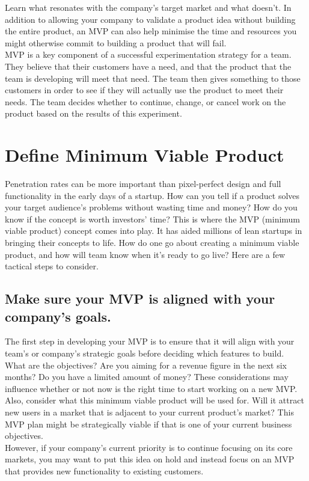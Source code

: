 \documentclass[paper=a4, fontsize=11pt]{scrartcl}
\numberwithin{equation}{section}		%
\numberwithin{figure}{section}			%
\numberwithin{table}{section}				%
\begin{document}
Learn what resonates with the company's target market and what doesn't. In addition to allowing your company to validate a product idea without building the entire product, an MVP can also help minimise the time and resources you might otherwise commit to building a product that will fail.\\
MVP is a key component of a successful experimentation strategy for a team. They believe that their customers have a need, and that the product that the team is developing will meet that need. The team then gives something to those customers in order to see if they will actually use the product to meet their needs. The team decides whether to continue, change, or cancel work on the product based on the results of this experiment.
\pagebreak

\section{Define Minimum Viable Product}
Penetration rates can be more important than pixel-perfect design and full functionality in the early days of a startup. How can you tell if a product solves your target audience's problems without wasting time and money? How do you know if the concept is worth investors' time? This is where the MVP (minimum viable product) concept comes into play. It has aided millions of lean startups in bringing their concepts to life.
How do one go about creating a minimum viable product, and how will team know when it's ready to go live? Here are a few tactical steps to consider.
\subsection{Make sure your MVP is aligned with your company's goals.}
The first step in developing your MVP is to ensure that it will align with your team's or company's strategic goals before deciding which features to build.\\
What are the objectives? Are you aiming for a revenue figure in the next six months? Do you have a limited amount of money? These considerations may influence whether or not now is the right time to start working on a new MVP.
Also, consider what this minimum viable product will be used for. Will it attract new users in a market that is adjacent to your current product's market? This MVP plan might be strategically viable if that is one of your current business objectives.\\
However, if your company's current priority is to continue focusing on its core markets, you may want to put this idea on hold and instead focus on an MVP that provides new functionality to existing customers.
\end{document}

